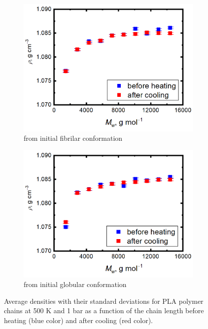 \begin{figure}[htb!]
	\begin{subfigure}{0.5\textwidth}
		\includegraphics[width=1.0\linewidth]{img/hustota_linear_new.png} 
		\caption{from initial fibrilar conformation}
		\vspace{-0.2cm}
	\end{subfigure}
	\begin{subfigure}{0.5\textwidth}
		\includegraphics[width=1.0\linewidth]{img/hustota_glob_new.png}
		\caption{from initial globular conformation}
		\vspace{-0.2cm}
	\end{subfigure} 
	\caption{Average densities with their standard deviations for PLA polymer chains at 500 K and 1 bar as a function of the chain length before heating (blue color) and after cooling (red color).}
	\label{fig:pla_hustoty}
	\vspace{-0.4cm}
\end{figure}

